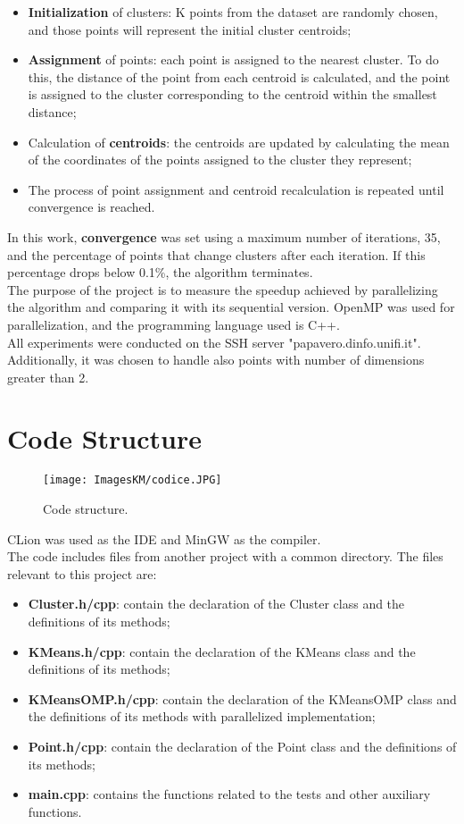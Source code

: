 \documentclass[10pt,twocolumn,letterpaper]{article}
\newcommand{\bit} {\begin{itemize} }
\newcommand{\eit} {\end{itemize} }
\begin{document}
\bit
    \item{\textbf{Initialization} of clusters: K points from the dataset are randomly chosen, and those points will represent the initial cluster centroids;}
    \item{\textbf{Assignment} of points: each point is assigned to the nearest cluster. To do this, the distance of the point from each centroid is calculated, and the point is assigned to the cluster corresponding to the centroid within the smallest distance;}
    \item{Calculation of \textbf{centroids}: the centroids are updated by calculating the mean of the coordinates of the points assigned to the cluster they represent;}
    \item{The process of point assignment and centroid recalculation is repeated until convergence is reached.\\}
\eit

In this work, \textbf{convergence} was set using a maximum number of iterations, 35, and the percentage of points that change clusters after each iteration. If this percentage drops below 0.1\%, the algorithm terminates.\\
The purpose of the project is to measure the speedup achieved by parallelizing the algorithm and comparing it with its sequential version. OpenMP was used for parallelization, and the programming language used is C++.\\
All experiments were conducted on the SSH server "papavero.dinfo.unifi.it".\\
Additionally, it was chosen to handle also points with number of dimensions greater than 2.


\section{Code Structure}

\begin{figure}[h]
    \centering
    \texttt{[image: ImagesKM/codice.JPG]}
    \caption{Code structure.}
\end{figure}

CLion was used as the IDE and MinGW as the compiler.\\
The code includes files from another project with a common directory. The files relevant to this project are:

\bit
    \item{\textbf{Cluster.h/cpp}: contain the declaration of the Cluster class and the definitions of its methods;}
    \item{\textbf{KMeans.h/cpp}: contain the declaration of the KMeans class and the definitions of its methods;}
    \item{\textbf{KMeansOMP.h/cpp}: contain the declaration of the KMeansOMP class and the definitions of its methods with parallelized implementation;}
    \item{\textbf{Point.h/cpp}: contain the declaration of the Point class and the definitions of its methods;}
    \item{\textbf{main.cpp}: contains the functions related to the tests and other auxiliary functions.}
\eit
\end{document}
